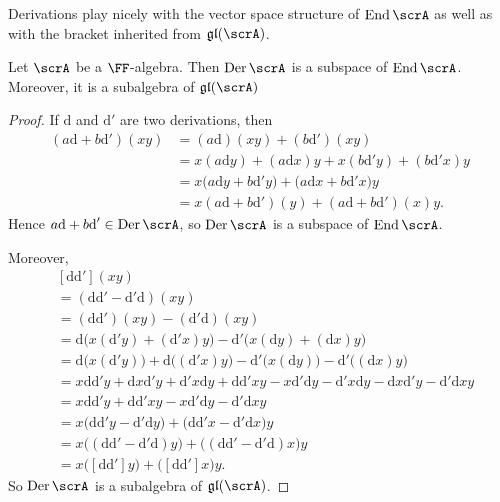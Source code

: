 \documentclass{article}
\newcommand{\lb}[1]{\ensuremath{\left[{#1}\right]}}
\DeclareMathOperator{\End}{End}
\DeclareMathOperator{\Der}{Der}
\newcommand{\dd}{\ensuremath{\text{d}}}
\newcommand{\glalg}{\ensuremath{\mathfrak{gl}}}
\begin{document}
Derivations play nicely with the vector space structure of $\End \scrA$ as well as with the bracket inherited from $\glalg(\scrA)$.

\begin{proposition}
    Let $\scrA$ be a $\FF$-algebra.
    Then $\Der \scrA$ is a subspace of $\End \scrA$.
    Moreover, it is a subalgebra of $\glalg(\scrA)$
\end{proposition}

\begin{proof}
    If $\dd$ and $\dd'$ are two derivations, then
    \begin{align*}
        (a\dd + b\dd')(xy)
        &=
        (a\dd)(xy) + (b\dd')(xy)
        \\
        &=
        x(a\dd y) + (a\dd x)y
        +
        x(b\dd'y) + (b\dd'x)y
        \\
        &=
        x
        \Big(
            a\dd y + b\dd'y
        \Big)
        +
        \Big(
            a\dd x + b\dd'x
        \Big)
        y
        \\
        &=
        x(a\dd + b\dd')(y)
        +
        (a\dd + b\dd')(x)y.
    \end{align*}
    Hence $a\dd + b\dd' \in \Der \scrA$, so $\Der \scrA$ is a subspace of $\End \scrA$.

    Moreover, 
    \begin{align*}
        &\lb{\dd\dd'}(xy)
        \\
        &=
        (\dd\dd' - \dd'\dd)(xy)
        \\
        &=
        (\dd\dd')(xy) - (\dd'\dd)(xy)
        \\
        &=
        \dd
        \Big(
            x(\dd'y) + (\dd'x)y
        \Big)
        -
        \dd'
        \Big(
            x(\dd y) + (\dd x)y
        \Big)
        \\
        &=
        \dd\Big(x(\dd'y)\Big) 
        +
        \dd\Big((\dd'x)y\Big) 
        -
        \dd'\Big(x(\dd y)\Big) 
        -
        \dd'\Big((\dd x)y\Big) 
        \\
        &=
        x\dd\dd'y
        +
        \dd x \dd' y
        +
        \dd'x \dd y
        +
        \dd\dd'x y
        -
        x\dd'\dd y
        -
        \dd' x \dd y
        -
        \dd x \dd' y
        -
        \dd' \dd x y
        \\
        &=
        x\dd\dd'y
        +
        \dd\dd'x y
        -
        x\dd'\dd y
        -
        \dd' \dd x y
        \\
        &=
        x
        \Big(
            \dd\dd'y - \dd'\dd y
        \Big)
        +
        \Big(
            \dd\dd'x - \dd'\dd x 
        \Big)
        y
        \\
        &=
        x\Big((\dd\dd' - \dd'\dd)y\Big)
        +
        \Big((\dd\dd' - \dd'\dd)x\Big)y
        \\
        &=
        x\Big(\lb{\dd\dd'}y\Big)
        +
        \Big(\lb{\dd\dd'}x\Big)y.
    \end{align*}
    So $\Der \scrA$ is a subalgebra of $\glalg(\scrA)$.
\end{proof}
\end{document}
